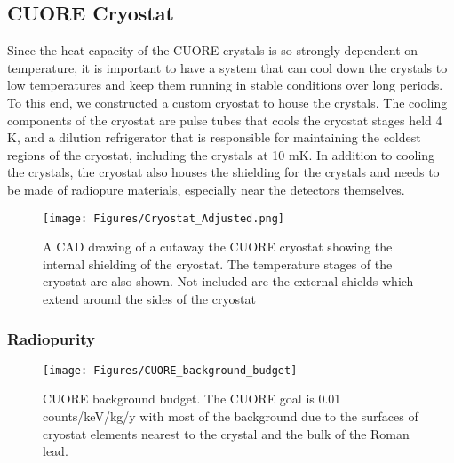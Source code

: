 \documentclass[12pt,a4paper]{article}
\begin{document}
\subsection{CUORE Cryostat}

Since the heat capacity of the CUORE crystals is so strongly dependent on temperature, it is important to have a system that can cool down the crystals to low temperatures and keep them running in stable conditions over long periods. To this end, we constructed a custom cryostat to house the crystals. The cooling components of the cryostat are pulse tubes that cools the cryostat stages held 4 K, and a dilution refrigerator that is responsible for maintaining the coldest regions of the cryostat, including the crystals at 10 mK. In addition to cooling the crystals, the cryostat also houses the shielding for the crystals and needs to be made of radiopure materials, especially near the detectors themselves.

\begin{figure}[htbp]
\centering
\texttt{[image: Figures/Cryostat\_Adjusted.png]}
\caption{A CAD drawing of a cutaway the CUORE cryostat showing the internal shielding of the cryostat. The temperature stages of the cryostat are also shown. Not included are the external shields which extend around the sides of the cryostat}
\label{fig:cryostat_cad_cutout}
\end{figure}

\begin{comment}
\subsubsection*{Cooling Systems}

Since the cyrostat needs to reach temperatures of 10 mK, a dilution refrigerator is used as the main cooling mechanism in the coldest stages of the cryostat. A dilution refrigerator works by diluting a He-3 solution
\end{comment}

\subsubsection*{Radiopurity}

\begin{figure}[htbp]
\centering
\texttt{[image: Figures/CUORE\_background\_budget]}
\caption{CUORE background budget. The CUORE goal is 0.01 counts/keV/kg/y with most of the background due to the surfaces of cryostat elements nearest to the crystal and the bulk of the Roman lead.}
\label{fig:istogramma}
\end{figure}
\end{document}
